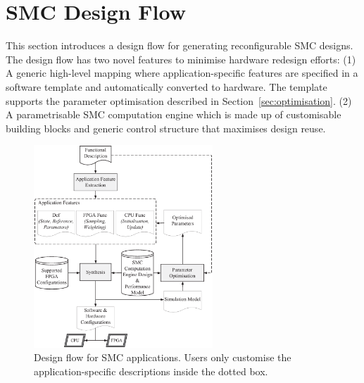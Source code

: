 

\section{SMC Design Flow}
\label{sec:design}

This section introduces a design flow for generating reconfigurable SMC 
designs. The design flow has two novel features to minimise hardware redesign efforts:
(1) A generic high-level mapping where application-specific features are specified in a software template and automatically converted to hardware.
The template supports the parameter optimisation described in Section~\ref{sec:optimisation}.
(2) A parametrisable SMC computation engine which is made up of customisable building blocks and generic control structure that maximises design reuse.

\begin{figure}[h]
\begin{center}
\includegraphics[width=0.6\textwidth]{design_flow/figures/flow}
\end{center}
\caption{Design flow for SMC applications. Users only customise the application-specific descriptions inside the dotted box.}
\label{fig:flow}
\end{figure}


